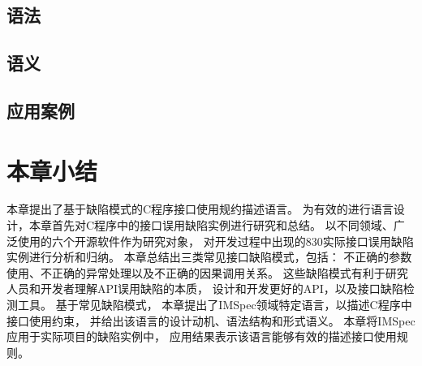 \subsection{语法}
\subsection{语义}
\subsection{应用案例}


\section{本章小结}
\label{sec:2.5}
本章提出了基于缺陷模式的C程序接口使用规约描述语言。
为有效的进行语言设计，本章首先对C程序中的接口误用缺陷实例进行研究和总结。
以不同领域、广泛使用的六个开源软件作为研究对象，
对开发过程中出现的830实际接口误用缺陷实例进行分析和归纳。
本章总结出三类常见接口缺陷模式，包括：
不正确的参数使用、不正确的异常处理以及不正确的因果调用关系。
这些缺陷模式有利于研究人员和开发者理解API误用缺陷的本质，
设计和开发更好的API，以及接口缺陷检测工具。
基于常见缺陷模式，
本章提出了IMSpec领域特定语言，以描述C程序中接口使用约束，
并给出该语言的设计动机、语法结构和形式语义。
本章将IMSpec应用于实际项目的缺陷实例中，
应用结果表示该语言能够有效的描述接口使用规则。